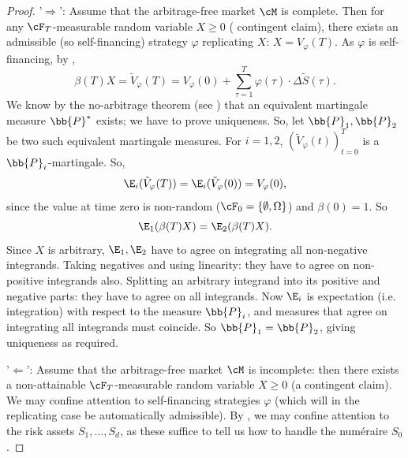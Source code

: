 \begin{proof}
	'\(\Rightarrow\)': Assume that the arbitrage-free market \(\cM\) is complete. Then for any \(\cF_T\)-measurable random variable \(X \geq 0\) ( contingent claim), there exists an admissible (so self-financing) strategy \(\varphi\) replicating \(X\): \(X = V_{\varphi}(T)\). As \(\varphi\) is self-financing, by ,
	\begin{equation}
		\beta(T)X = \tilde{V}_{\varphi}(T) = V_{\varphi}(0) + \sum_{\tau=1}^{T} \varphi(\tau) \cdot \Delta \tilde{S}(\tau).
	\end{equation}
	We know by the no-arbitrage theorem (see ) that an equivalent martingale measure \(\bb{P}^*\) exists; we have to prove uniqueness. So, let \(\bb{P}_1, \bb{P}_2\) be two such equivalent martingale measures. For \(i = 1, 2\), \((\tilde{V}_{\varphi}(t))_{t=0}^T\) is a \(\bb{P}_i\)-martingale. So,
	\begin{equation}
		\E_i(\tilde{V}_{\varphi}(T)) = \E_i(\tilde{V}_{\varphi}(0)) = V_{\varphi}(0),
	\end{equation}
	since the value at time zero is non-random (\(\cF_0 = \{\emptyset, \Omega\}\)) and \(\beta(0) = 1\). So
	\begin{equation}
		\E_1(\beta(T)X) = \E_2(\beta(T)X).
	\end{equation}
	Since \(X\) is arbitrary, \(\E_1, \E_2\) have to agree on integrating all non-negative integrands. Taking negatives and using linearity: they have to agree on non-positive integrands also. Splitting an arbitrary integrand into its positive and negative parts: they have to agree on all integrands. Now \(\E_i\) is expectation (i.e. integration) with respect to the measure \(\bb{P}_i\), and measures that agree on integrating all integrands must coincide. So \(\bb{P}_1 = \bb{P}_2\), giving uniqueness as required.

	'\(\Leftarrow\)': Assume that the arbitrage-free market \(\cM\) is incomplete: then there exists a non-attainable \(\cF_T\)-measurable random variable \(X \geq 0\) (a contingent claim). We may confine attention to self-financing strategies \(\varphi\) (which will in the replicating case be automatically admissible). By , we may confine attention to the risk assets \(S_1, \dots, S_d\), as these suffice to tell us how to handle the num\'eraire \(S_0\).


\end{proof}
